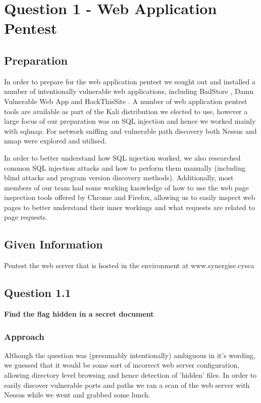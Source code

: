 \chapter{Question 1 - Web Application Pentest}

\section{Preparation}
In order to prepare for the web application pentest we sought out and installed
a number of intentionally vulnerable web applications, including BadStore
\cite{BadStore}, Damn Vulnerable Web App \cite{DamnVulnerableWebApp} and
HackThisSite \cite{HackThisSite}. A number of web application pentest tools are
available as part of the Kali distribution we elected to use, however a large
focus of our preparation was on SQL injection and hence we worked mainly with
sqlmap. For network sniffing and vulnerable path discovery both Nessus and nmap
were explored and utilised.

In order to better understand how SQL injection worked, we also researched
common SQL injection attacks and how to perform them manually (including blind
attacks and program version discovery methods). Additionally, most members of
our team had some working knowledge of how to use the web page inspection tools
offered by Chrome and Firefox, allowing us to easily inspect web pages to better
understand their inner workings and what requests are related to page requests.

\section{Given Information}
Pentest the web server that is hosted in the environment at www.synergise.cysca

\section{Question 1.1}
\textbf{Find the flag hidden in a secret document}
\subsection{Approach}
Although the question was (presumably intentionally) ambiguous in it's wording,
we guessed that it would be some sort of incorrect web server configuration,
allowing directory level browsing and hence detection of 'hidden' files. In
order to easily discover vulnerable ports and paths we ran a scan of the web
server with Nessus while we went and grabbed some lunch.

